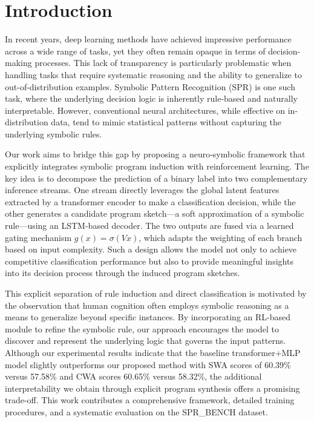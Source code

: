 \documentclass{article}
\begin{document}
\section{Introduction}
In recent years, deep learning methods have achieved impressive performance across a wide range of tasks, yet they often remain opaque in terms of decision-making processes. This lack of transparency is particularly problematic when handling tasks that require systematic reasoning and the ability to generalize to out-of-distribution examples. Symbolic Pattern Recognition (SPR) is one such task, where the underlying decision logic is inherently rule-based and naturally interpretable. However, conventional neural architectures, while effective on in-distribution data, tend to mimic statistical patterns without capturing the underlying symbolic rules.

Our work aims to bridge this gap by proposing a neuro‐symbolic framework that explicitly integrates symbolic program induction with reinforcement learning. The key idea is to decompose the prediction of a binary label into two complementary inference streams. One stream directly leverages the global latent features extracted by a transformer encoder to make a classification decision, while the other generates a candidate program sketch—a soft approximation of a symbolic rule—using an LSTM-based decoder. The two outputs are fused via a learned gating mechanism \( g(x)=\sigma(Vx) \), which adapts the weighting of each branch based on input complexity. Such a design allows the model not only to achieve competitive classification performance but also to provide meaningful insights into its decision process through the induced program sketches.

This explicit separation of rule induction and direct classification is motivated by the observation that human cognition often employs symbolic reasoning as a means to generalize beyond specific instances. By incorporating an RL-based module to refine the symbolic rule, our approach encourages the model to discover and represent the underlying logic that governs the input patterns. Although our experimental results indicate that the baseline transformer+MLP model slightly outperforms our proposed method with SWA scores of 60.39\% versus 57.58\% and CWA scores 60.65\% versus 58.32\%, the additional interpretability we obtain through explicit program synthesis offers a promising trade-off. This work contributes a comprehensive framework, detailed training procedures, and a systematic evaluation on the SPR\_BENCH dataset.
\end{document}
